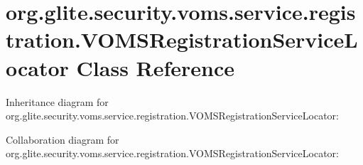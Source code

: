 \hypertarget{classorg_1_1glite_1_1security_1_1voms_1_1service_1_1registration_1_1VOMSRegistrationServiceLocator}{
\section{org.glite.security.voms.service.registration.VOMSRegistrationServiceLocator Class Reference}
\label{classorg_1_1glite_1_1security_1_1voms_1_1service_1_1registration_1_1VOMSRegistrationServiceLocator}
}


Inheritance diagram for org.glite.security.voms.service.registration.VOMSRegistrationServiceLocator:


Collaboration diagram for org.glite.security.voms.service.registration.VOMSRegistrationServiceLocator:

